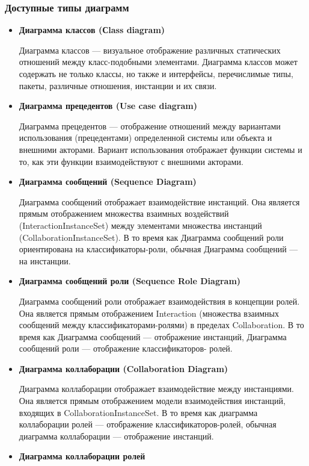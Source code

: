 \documentclass[a4paper,12pt]{extreport}
\begin{document}
\subsubsection*{Доступные типы диаграмм}
\begin{itemize}
 
\item \textbf{Диаграмма классов (Сlass diagram)}

Диаграмма классов --- визуальное отображение различных статических отношений между
класс-подобными элементами. Диаграмма классов может содержать не только классы, но
также и интерфейсы, перечислимые типы, пакеты, различные отношения, инстанции и их
связи.
\item \textbf{Диаграмма прецедентов (Use case diagram)}

Диаграмма прецедентов --- отображение отношений между вариантами использования
(прецедентами) определенной системы или объекта и внешними акторами. Вариант
использования отображает функции системы и то, как эти функции взаимодействуют с
внешними акторами.
\item \textbf{Диаграмма сообщений (Sequence Diagram)}

Диаграмма сообщений отображает взаимодействие инстанций. Она является прямым отображением множества взаимных воздействий (InteractionInstanceSet) между элементами
множества инстанций (CollaborationInstanceSet). В то время как Диаграмма сообщений роли
ориентирована на классификаторы-роли, обычная Диаграмма сообщений --- на инстанции.
\item \textbf{Диаграмма сообщений роли (Sequence Role Diagram)}

Диаграмма сообщений роли отображает взаимодействия в концепции ролей. Она является
прямым отображением Interaction (множества взаимных сообщений между
классификаторами-ролями) в пределах Collaboration. В то время как Диаграмма сообщений
--- отображение инстанций, Диаграмма сообщений роли --- отображение классификаторов-
ролей.
\item \textbf{Диаграмма коллаборации (Collaboration Diagram)}

 Диаграмма коллаборации отображает взаимодействие между инстанциями. Она является
прямым отображением модели взаимодействия инстанций, входящих в CollaborationInstanceSet. В то время как диаграмма коллаборации ролей --- отображение
классификаторов-ролей, обычная диаграмма коллаборации --- отображение инстанций.
\item \textbf{Диаграмма коллаборации ролей}


\end{itemize}
\end{document}
